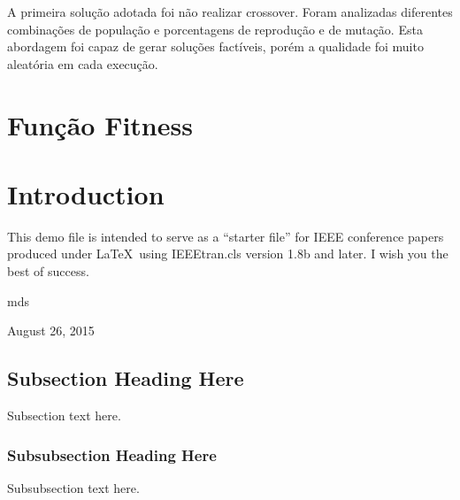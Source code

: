 \documentclass[conference]{IEEEtran}
\begin{document}

A primeira solução adotada foi não realizar crossover. Foram analizadas diferentes combinações de população e porcentagens de reprodução e de mutação. Esta abordagem foi capaz de gerar soluções factíveis, porém a qualidade foi muito aleatória em cada execução.

\section{Função Fitness}

%
\IEEEpeerreviewmaketitle



\section{Introduction}
This demo file is intended to serve as a ``starter file''
for IEEE conference papers produced under \LaTeX\ using
IEEEtran.cls version 1.8b and later.
I wish you the best of success.

\hfill mds
 
\hfill August 26, 2015

\subsection{Subsection Heading Here}
Subsection text here.


\subsubsection{Subsubsection Heading Here}
Subsubsection text here.
\end{document}
